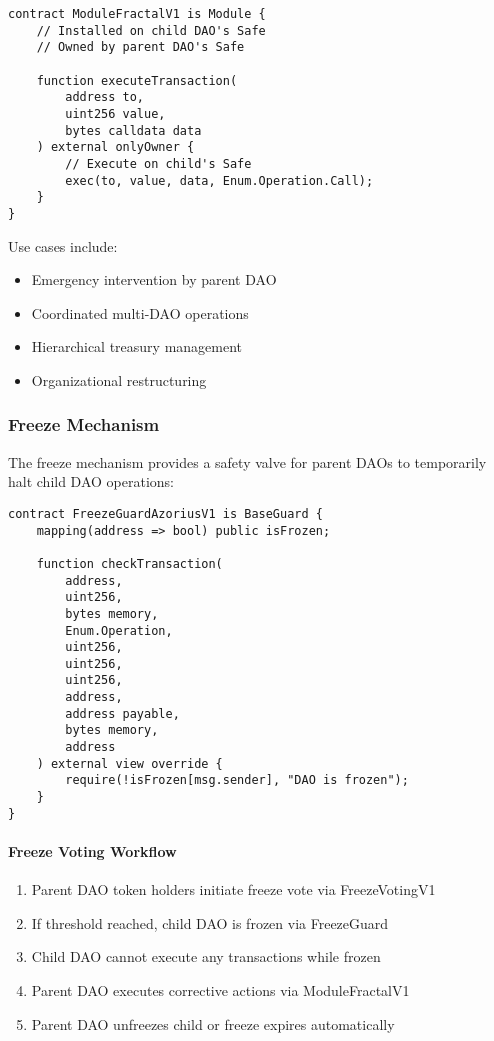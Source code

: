 \documentclass[11pt,a4paper]{article}
\begin{document}
\begin{lstlisting}[caption=Parent-Child Relationship]
contract ModuleFractalV1 is Module {
    // Installed on child DAO's Safe
    // Owned by parent DAO's Safe

    function executeTransaction(
        address to,
        uint256 value,
        bytes calldata data
    ) external onlyOwner {
        // Execute on child's Safe
        exec(to, value, data, Enum.Operation.Call);
    }
}
\end{lstlisting}

Use cases include:
\begin{itemize}
    \item Emergency intervention by parent DAO
    \item Coordinated multi-DAO operations
    \item Hierarchical treasury management
    \item Organizational restructuring
\end{itemize}

\subsubsection{Freeze Mechanism}

The freeze mechanism provides a safety valve for parent DAOs to temporarily halt child DAO operations:

\begin{lstlisting}[caption=Freeze Guard Architecture]
contract FreezeGuardAzoriusV1 is BaseGuard {
    mapping(address => bool) public isFrozen;

    function checkTransaction(
        address,
        uint256,
        bytes memory,
        Enum.Operation,
        uint256,
        uint256,
        uint256,
        address,
        address payable,
        bytes memory,
        address
    ) external view override {
        require(!isFrozen[msg.sender], "DAO is frozen");
    }
}
\end{lstlisting}

\paragraph{Freeze Voting Workflow}

\begin{enumerate}
    \item Parent DAO token holders initiate freeze vote via FreezeVotingV1
    \item If threshold reached, child DAO is frozen via FreezeGuard
    \item Child DAO cannot execute any transactions while frozen
    \item Parent DAO executes corrective actions via ModuleFractalV1
    \item Parent DAO unfreezes child or freeze expires automatically
\end{enumerate}
\end{document}
